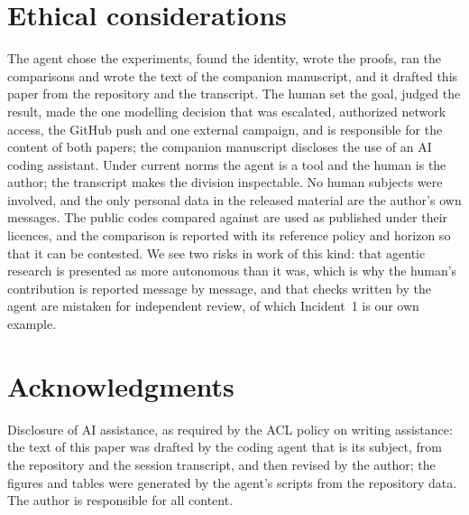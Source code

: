 \section*{Ethical considerations}
The agent chose the experiments, found the identity, wrote the proofs, ran the comparisons and wrote
the text of the companion manuscript, and it drafted this paper from the repository and the
transcript. The human set the goal, judged the result, made the one modelling decision that was
escalated, authorized network access, the GitHub push and one external campaign, and is responsible
for the content of both papers; the companion manuscript discloses the use of an AI coding
assistant. Under current norms the agent is a tool and the human is the author; the transcript
makes the division inspectable. No human subjects were involved, and the only personal data in the
released material are the author's own messages. The public codes compared against are used as
published under their licences, and the comparison is reported with its reference policy and horizon
so that it can be contested. We see two risks in work of this kind: that agentic research is
presented as more autonomous than it was, which is why the human's contribution is reported message
by message, and that checks written by the agent are mistaken for independent review, of which
Incident~1 is our own example.

\section*{Acknowledgments}
Disclosure of AI assistance, as required by the ACL policy on writing assistance: the text of this
paper was drafted by the coding agent that is its subject, from the repository and the session
transcript, and then revised by the author; the figures and tables were generated by the agent's
scripts from the repository data. The author is responsible for all content.
